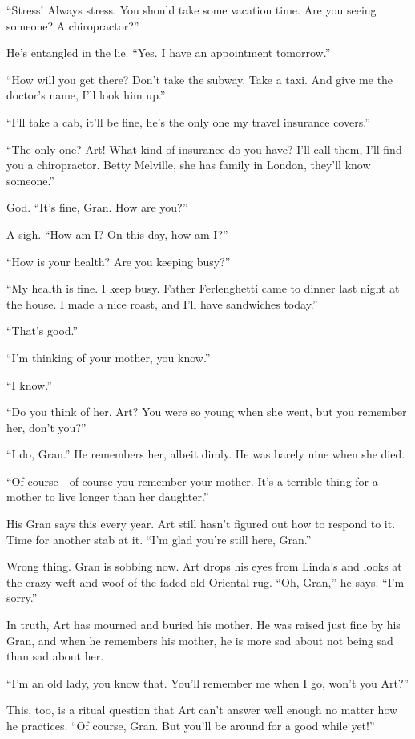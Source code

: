 “Stress! Always stress. You should take some vacation time. Are you
seeing someone? A chiropractor?”

He’s entangled in the lie. “Yes. I have an appointment tomorrow.”

“How will you get there? Don’t take the subway. Take a taxi. And
give me the doctor’s name, I’ll look him up.”

“I’ll take a cab, it’ll be fine, he’s the only one my travel
insurance covers.”

“The only one? Art! What kind of insurance do you have? I’ll call
them, I’ll find you a chiropractor. Betty Melville, she has family
in London, they’ll know someone.”

God. “It’s fine, Gran. How are you?”

A sigh. “How am I? On this day, how am I?”

“How is your health? Are you keeping busy?”

“My health is fine. I keep busy. Father Ferlenghetti came to dinner
last night at the house. I made a nice roast, and I’ll have
sandwiches today.”

“That’s good.”

“I’m thinking of your mother, you know.”

“I know.”

“Do you think of her, Art? You were so young when she went, but you
remember her, don’t you?”

“I do, Gran.” He remembers her, albeit dimly. He was barely nine
when she died.

“Of course—of course you remember your mother. It’s a terrible
thing for a mother to live longer than her daughter.”

His Gran says this every year. Art still hasn’t figured out how to
respond to it. Time for another stab at it. “I’m glad you’re still
here, Gran.”

Wrong thing. Gran is sobbing now. Art drops his eyes from Linda’s
and looks at the crazy weft and woof of the faded old Oriental rug.
“Oh, Gran,” he says. “I’m sorry.”

In truth, Art has mourned and buried his mother. He was raised just
fine by his Gran, and when he remembers his mother, he is more sad
about not being sad than sad about her.

“I’m an old lady, you know that. You’ll remember me when I go,
won’t you Art?”

This, too, is a ritual question that Art can’t answer well enough
no matter how he practices. “Of course, Gran. But you’ll be around
for a good while yet!”

